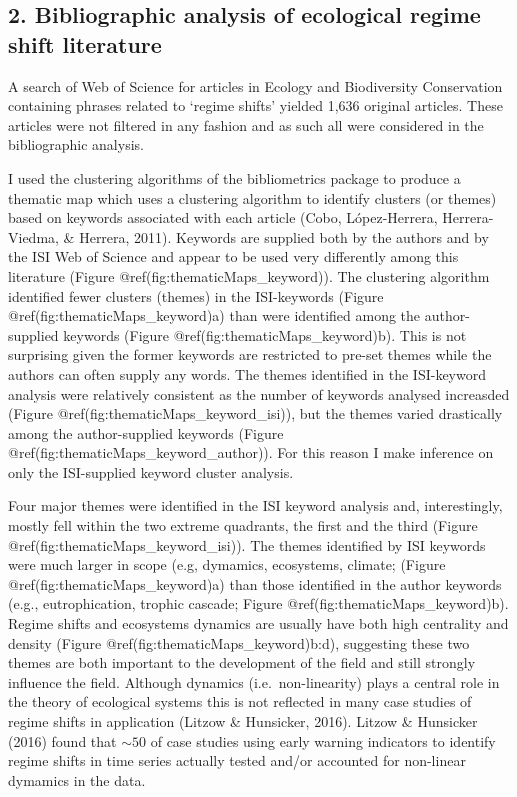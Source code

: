 \documentclass[12pt,twoside,openany]{reedthesis}
\begin{document}
\hypertarget{bibliographic-analysis-of-ecological-regime-shift-literature-1}{%
\subsection{2. Bibliographic analysis of ecological regime shift literature}\label{bibliographic-analysis-of-ecological-regime-shift-literature-1}}

A search of Web of Science for articles in Ecology and Biodiversity Conservation containing phrases related to `regime shifts' yielded 1,636 original articles. These articles were not filtered in any fashion and as such all were considered in the bibliographic analysis.

I used the clustering algorithms of the bibliometrics package to produce a thematic map which uses a clustering algorithm to identify clusters (or themes) based on keywords associated with each article (Cobo, López-Herrera, Herrera-Viedma, \& Herrera, 2011). Keywords are supplied both by the authors and by the ISI Web of Science and appear to be used very differently among this literature (Figure @ref(fig:thematicMaps\_keyword)).
The clustering algorithm identified fewer clusters (themes) in the ISI-keywords (Figure @ref(fig:thematicMaps\_keyword)a) than were identified among the author-supplied keywords (Figure @ref(fig:thematicMaps\_keyword)b). This is not surprising given the former keywords are restricted to pre-set themes while the authors can often supply any words. The themes identified in the ISI-keyword analysis were relatively consistent as the number of keywords analysed increasded (Figure @ref(fig:thematicMaps\_keyword\_isi)), but the themes varied drastically among the author-supplied keywords (Figure @ref(fig:thematicMaps\_keyword\_author)). For this reason I make inference on only the ISI-supplied keyword cluster analysis.

Four major themes were identified in the ISI keyword analysis and, interestingly, mostly fell within the two extreme quadrants, the first and the third (Figure @ref(fig:thematicMaps\_keyword\_isi)). The themes identified by ISI keywords were much larger in scope (e.g, dymamics, ecosystems, climate; (Figure @ref(fig:thematicMaps\_keyword)a) than those identified in the author keywords (e.g., eutrophication, trophic cascade; Figure @ref(fig:thematicMaps\_keyword)b). Regime shifts and ecosystems dynamics are usually have both high centrality and density (Figure @ref(fig:thematicMaps\_keyword)b:d), suggesting these two themes are both important to the development of the field and still strongly influence the field. Although dynamics (i.e.~non-linearity) plays a central role in the theory of ecological systems this is not reflected in many case studies of regime shifts in application (Litzow \& Hunsicker, 2016). Litzow \& Hunsicker (2016) found that \(\sim50%
\) of case studies using early warning indicators to identify regime shifts in time series actually tested and/or accounted for non-linear dymamics in the data.
\end{document}
